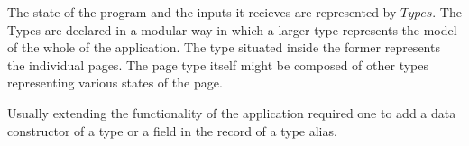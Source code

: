 The state of
the program and the inputs it recieves are represented by $Types$. The Types
are declared in a modular way in which a larger type represents the model of
the whole of the application. The type situated inside the former represents
the individual pages. The page type itself might be composed of other types
representing various states of the page.

Usually extending the
functionality of the application required one to add a data constructor of a
type or a field in the record of a type alias.
